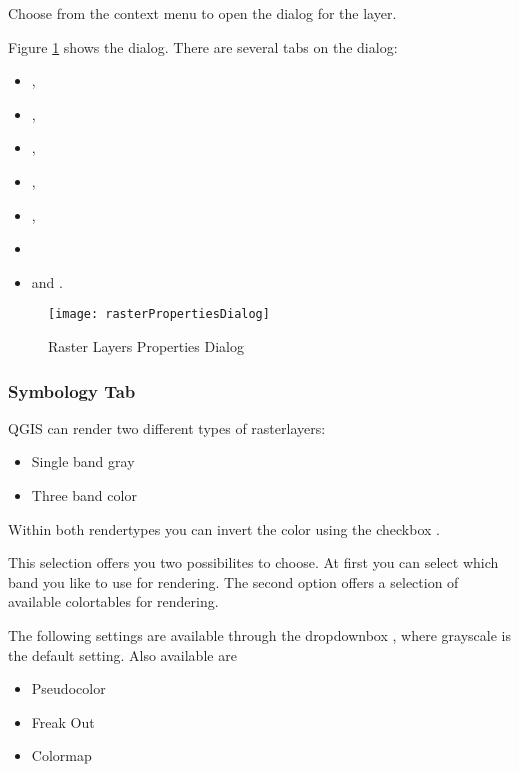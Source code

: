 Choose  from the context menu to open the
dialog for the layer.

Figure \ref{fig:raster_properties} shows the  dialog. There are several
tabs on the dialog: 
\begin{itemize}
 \item {}, 
 \item {},
 \item {},
 \item {}, 
 \item {}, 
 \item {} 
 \item and .
\end{itemize}

\begin{figure}[h]
  \begin{center}
   \caption{Raster Layers Properties Dialog}\label{fig:raster_properties}\smallskip
   \texttt{[image: rasterPropertiesDialog]}
\end{center}  
\end{figure}

\subsubsection{Symbology Tab}\label{label_sombology}

QGIS can render two different types of rasterlayers:

\begin{itemize}
\item Single band gray
\item Three band color
\end{itemize}

Within both rendertypes you can invert the color using the checkbox
.


This selection offers you two possibilites to choose. At first you can
select which band you like to use for rendering. The second option offers
a selection of available colortables for rendering.

The following settings are available through the dropdownbox
, where grayscale is the default
setting.
Also available are
\begin{itemize}
\item Pseudocolor
\item Freak Out
\item Colormap
\end{itemize}

